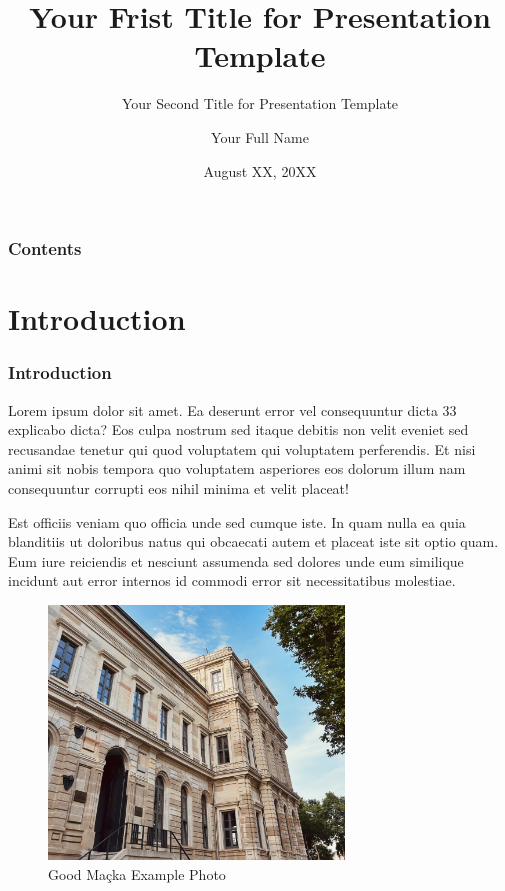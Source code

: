 \documentclass[10t]{beamer}
\title{Your Frist Title for Presentation Template}
\subtitle{Your Second Title for Presentation Template}
\author{Your Full Name}
\institute{\href{https://www.itu.edu.tr/en}{Istanbul Technical University}}
\date{August XX, 20XX}
\begin{document}
\captionsetup{justification=centering}

\frame{\titlepage}

\begin{frame}
\frametitle{Contents}
\tableofcontents
\end{frame}

\section{Introduction}

\begin{frame}
\frametitle{Introduction}

Lorem ipsum dolor sit amet. Ea deserunt error vel consequuntur dicta 33 explicabo dicta? Eos culpa nostrum sed itaque debitis non velit eveniet sed recusandae tenetur qui quod voluptatem qui voluptatem perferendis. Et nisi animi sit nobis tempora quo voluptatem asperiores eos dolorum illum nam consequuntur corrupti eos nihil minima et velit placeat!

Est officiis veniam quo officia unde sed cumque iste. In quam nulla ea quia blanditiis ut doloribus natus qui obcaecati autem et placeat iste sit optio quam. Eum iure reiciendis et nesciunt assumenda sed dolores unde eum similique incidunt aut error internos id commodi error sit necessitatibus molestiae.

\end{frame}

\begin{frame}

\begin{figure}
\centering
\includegraphics[width=0.7\textwidth]{figures/itu_example_photo.jpg}
\caption{Good Maçka Example Photo}
\end{figure}
    
\end{frame}
\end{document}
